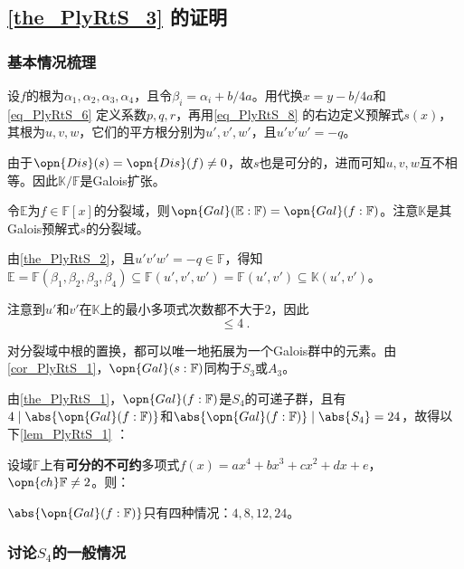 \subsection{\autoref{the_PlyRtS_3} 的证明}

\subsubsection{基本情况梳理}


设$f$的根为$\alpha_1, \alpha_2, \alpha_3, \alpha_4$，且令$\beta_i=\alpha_i+b/4a$。用代换$x=y-b/4a$和\autoref{eq_PlyRtS_6} 定义系数$p, q, r$，再用\autoref{eq_PlyRtS_8}  的右边定义预解式$s(x)$，其根为$u, v, w$，它们的平方根分别为$u', v', w'$，且$u'v'w'=-q$。

由于$\opn{Dis}(s)=\opn{Dis}(f)\neq 0$，故$s$也是可分的，进而可知$u, v, w$互不相等。因此$\mathbb{K}/\mathbb{F}$是Galois扩张。

令$\mathbb{E}$为$f\in\mathbb{F}[x]$的分裂域，则$\opn{Gal}(\mathbb{E}:\mathbb{F})=\opn{Gal}(f:\mathbb{F})$。注意$\mathbb{K}$是其Galois预解式$s$的分裂域。

由\autoref{the_PlyRtS_2}，且$u'v'w'=-q\in\mathbb{F}$，得知$\mathbb{E}=\mathbb{F}(\beta_1, \beta_2, \beta_3, \beta_4)\subseteq\mathbb{F}(u', v', w')=\mathbb{F}(u', v')\subseteq\mathbb{K}(u', v')$。

注意到$u'$和$v'$在$\mathbb{K}$上的最小多项式次数都不大于$2$，因此
\begin{equation}
[\mathbb{E}:\mathbb{K}]\leq 4~.
\end{equation}

对分裂域中根的置换，都可以唯一地拓展为一个Galois群中的元素。由\autoref{cor_PlyRtS_1}，$\opn{Gal}(s:\mathbb{F})$同构于$S_3$或$A_3$。

由\autoref{the_PlyRtS_1}，$\opn{Gal}(f:\mathbb{F})$是$S_4$的可递子群，且有$4\mid\abs{\opn{Gal}(f:\mathbb{F})}$和$\abs{\opn{Gal}(f:\mathbb{F})}\mid \abs{S_4}=24$，故得以下\autoref{lem_PlyRtS_1} ：

\begin{lemma}{}\label{lem_PlyRtS_1}
设域$\mathbb{F}$上有\textbf{可分的不可约}多项式$f(x)=ax^4+bx^3+cx^2+dx+e$，$\opn{ch}\mathbb{F}\neq 2$。则：

$\abs{\opn{Gal}(f:\mathbb{F})}$只有四种情况：$4, 8, 12, 24$。
\end{lemma}



\subsubsection{讨论$S_4$的一般情况}


